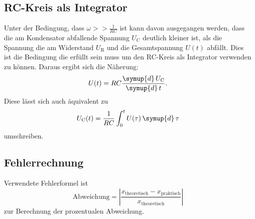 \subsection{RC-Kreis als Integrator}

Unter der Bedingung, dass $\omega>>\frac{1}{RC}$ ist kann davon ausgegangen werden, dass
 die am Kondensator abfallende Spannung $U_\text{C}$ deutlich kleiner ist, als die Spannung
 die am Widerstand $U_\text{R}$ und die Gesamtspannung $U(t)$ abfällt. Dies ist die
 Bedingung die erfüllt sein muss
 um den RC-Kreis als Integrator verwenden zu können.
 Daraus ergibt sich die Näherung:
 \begin{equation}
   U(t) = R C \frac{\symup{d}\,U_\text{C}}{\symup{d}\,t}.
   \label{eqn:14}
\end{equation}
Diese lässt sich auch äquivalent zu
\begin{equation}
U_\text{C}(t)= \frac{1}{RC} \int_0^t U(\tau) \,\symup{d}\,\tau
\label{eqn:integral}
\end{equation}
umschreiben.

\subsection{Fehlerrechnung}
Verwendete Fehlerformel ist
\begin{equation}
  \text{Abweichung} = \left|\frac{x_\text{theoretisch}-x_\text{praktisch}}{x_\text{theoretisch}}\right|
  \label{eqn:abweichung}
\end{equation}
zur Berechnung der prozentualen Abweichung.
